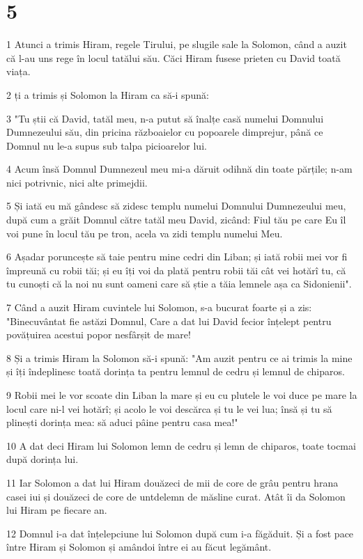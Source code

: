 \chapter{5}

\par 1 Atunci a trimis Hiram, regele Tirului, pe slugile sale la Solomon, când a auzit că l-au uns rege în locul tatălui său. Căci Hiram fusese prieten cu David toată viața.
\par 2 ți a trimis și Solomon la Hiram ca să-i spună:
\par 3 "Tu știi că David, tatăl meu, n-a putut să înalțe casă numelui Domnului Dumnezeului său, din pricina războaielor cu popoarele dimprejur, până ce Domnul nu le-a supus sub talpa picioarelor lui.
\par 4 Acum însă Domnul Dumnezeul meu mi-a dăruit odihnă din toate părțile; n-am nici potrivnic, nici alte primejdii.
\par 5 Și iată eu mă gândesc să zidesc templu numelui Domnului Dumnezeului meu, după cum a grăit Domnul către tatăl meu David, zicând: Fiul tău pe care Eu îl voi pune în locul tău pe tron, acela va zidi templu numelui Meu.
\par 6 Așadar poruncește să taie pentru mine cedri din Liban; și iată robii mei vor fi împreună cu robii tăi; și eu îți voi da plată pentru robii tăi cât vei hotărî tu, că tu cunoști că la noi nu sunt oameni care să știe a tăia lemnele așa ca Sidonienii".
\par 7 Când a auzit Hiram cuvintele lui Solomon, s-a bucurat foarte și a zis: "Binecuvântat fie astăzi Domnul, Care a dat lui David fecior înțelept pentru povățuirea acestui popor nesfârșit de mare!
\par 8 Și a trimis Hiram la Solomon să-i spună: "Am auzit pentru ce ai trimis la mine și îți îndeplinesc toată dorința ta pentru lemnul de cedru și lemnul de chiparos.
\par 9 Robii mei le vor scoate din Liban la mare și eu cu plutele le voi duce pe mare la locul care ni-l vei hotărî; și acolo le voi descărca și tu le vei lua; însă și tu să plinești dorința mea: să aduci pâine pentru casa mea!"
\par 10 A dat deci Hiram lui Solomon lemn de cedru și lemn de chiparos, toate tocmai după dorința lui.
\par 11 Iar Solomon a dat lui Hiram douăzeci de mii de core de grâu pentru hrana casei iui și douăzeci de core de untdelemn de măsline curat. Atât îi da Solomon lui Hiram pe fiecare an.
\par 12 Domnul i-a dat înțelepciune lui Solomon după cum i-a făgăduit. Și a fost pace între Hiram și Solomon și amândoi între ei au făcut legământ.
